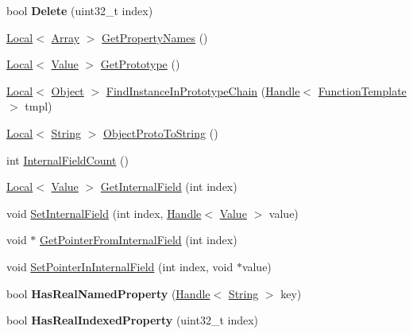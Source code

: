 \begin{DoxyCompactItemize}
\item 
\hypertarget{classv8_1_1_object_a63f88a22cb5d994eedc1efc79520bc42}{}bool {\bfseries Delete} (uint32\+\_\+t index)\label{classv8_1_1_object_a63f88a22cb5d994eedc1efc79520bc42}

\item 
\hyperlink{classv8_1_1_local}{Local}$<$ \hyperlink{classv8_1_1_array}{Array} $>$ \hyperlink{classv8_1_1_object_a9f45786246c6e6027b32f685d900a41f}{Get\+Property\+Names} ()
\item 
\hyperlink{classv8_1_1_local}{Local}$<$ \hyperlink{classv8_1_1_value}{Value} $>$ \hyperlink{classv8_1_1_object_ae8d3fed7d6dbd667c29cabb3039fe7af}{Get\+Prototype} ()
\item 
\hyperlink{classv8_1_1_local}{Local}$<$ \hyperlink{classv8_1_1_object}{Object} $>$ \hyperlink{classv8_1_1_object_ab2c5f7369abf08ae8f44dc84f5aa335a}{Find\+Instance\+In\+Prototype\+Chain} (\hyperlink{classv8_1_1_handle}{Handle}$<$ \hyperlink{classv8_1_1_function_template}{Function\+Template} $>$ tmpl)
\item 
\hyperlink{classv8_1_1_local}{Local}$<$ \hyperlink{classv8_1_1_string}{String} $>$ \hyperlink{classv8_1_1_object_aeb2f524c806075e5f9032a24afd86869}{Object\+Proto\+To\+String} ()
\item 
int \hyperlink{classv8_1_1_object_aaec28576353eebe6fee113bce2718ecc}{Internal\+Field\+Count} ()
\item 
\hyperlink{classv8_1_1_local}{Local}$<$ \hyperlink{classv8_1_1_value}{Value} $>$ \hyperlink{classv8_1_1_object_aa3324fdf652d8ac3b2f27faa0559231d}{Get\+Internal\+Field} (int index)
\item 
void \hyperlink{classv8_1_1_object_a361b1781e7db29b17b063ef31315989e}{Set\+Internal\+Field} (int index, \hyperlink{classv8_1_1_handle}{Handle}$<$ \hyperlink{classv8_1_1_value}{Value} $>$ value)
\item 
void $\ast$ \hyperlink{classv8_1_1_object_a8ef1f3e0d4f4cecc54d5e0248bc45694}{Get\+Pointer\+From\+Internal\+Field} (int index)
\item 
void \hyperlink{classv8_1_1_object_a697c8b6945ab4cb4bf468414bb4c1234}{Set\+Pointer\+In\+Internal\+Field} (int index, void $\ast$value)
\item 
\hypertarget{classv8_1_1_object_a5c29998a9ec60802b052f528a1aaa7fd}{}bool {\bfseries Has\+Real\+Named\+Property} (\hyperlink{classv8_1_1_handle}{Handle}$<$ \hyperlink{classv8_1_1_string}{String} $>$ key)\label{classv8_1_1_object_a5c29998a9ec60802b052f528a1aaa7fd}

\item 
\hypertarget{classv8_1_1_object_a29dce0e7da968dae54614501f035f7e9}{}bool {\bfseries Has\+Real\+Indexed\+Property} (uint32\+\_\+t index)\label{classv8_1_1_object_a29dce0e7da968dae54614501f035f7e9}


\end{DoxyCompactItemize}
